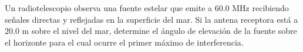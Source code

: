 \item Un radiotelescopio observa una fuente estelar que emite a $60.0\text{ MHz}$ recibiendo señales directas y reflejadas en la superficie del mar. Si la antena receptora está a $20.0\text{ m}$ sobre el nivel del mar, determine el ángulo de elevación de la fuente sobre el horizonte para el cual ocurre el primer máximo de interferencia.